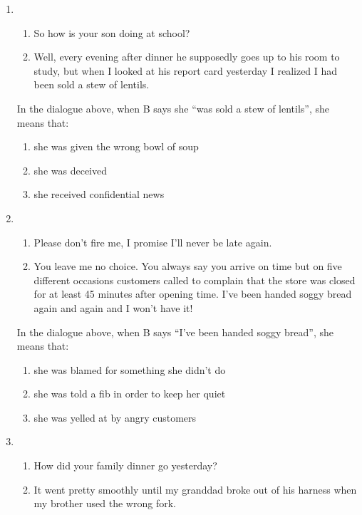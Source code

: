 \documentclass[output=paper]{langsci/langscibook}
\begin{document}
\begin{paperappendix}
\begin{enumerate}
    \item
        \begin{enumerate}[nosep,label=\Alph*:]
        \item So how is your son doing at school?
        \item Well, every evening after dinner he supposedly goes up to his room to study, but when I looked at his report card yesterday I realized I had been sold a stew of lentils.
        \end{enumerate}
        In the dialogue above, when B says she \enquote{was sold a stew of lentils}, she means that:
        \begin{enumerate}[label=\arabic*.,noitemsep]
        \item she was given the wrong bowl of soup
        \item she was deceived
        \item she received confidential news
        \end{enumerate}
    \item
       \begin{enumerate}[nosep,label=\Alph*:]
        \item Please don't fire me, I promise I’ll never be late again.
        \item You leave me no choice. You always say you arrive on time but on five different occasions customers called to complain that the store was closed for at least 45 minutes after opening time. I've been handed soggy bread again and again and I won't have it!
        \end{enumerate}
        In the dialogue above, when B says \enquote{I've been handed soggy bread}, she means that:
        \begin{enumerate}[label=\arabic*.,noitemsep]
        \item she was blamed for something she didn't do
        \item she was told a fib in order to keep her quiet
        \item she was yelled at by angry customers
        \end{enumerate}
    \item
        \begin{enumerate}[nosep,label=\Alph*:]
        \item How did your family dinner go yesterday?
        \item It went pretty smoothly until my granddad broke out of his harness when my brother used the wrong fork.
        \end{enumerate}

\end{enumerate}
\end{paperappendix}
\end{document}

